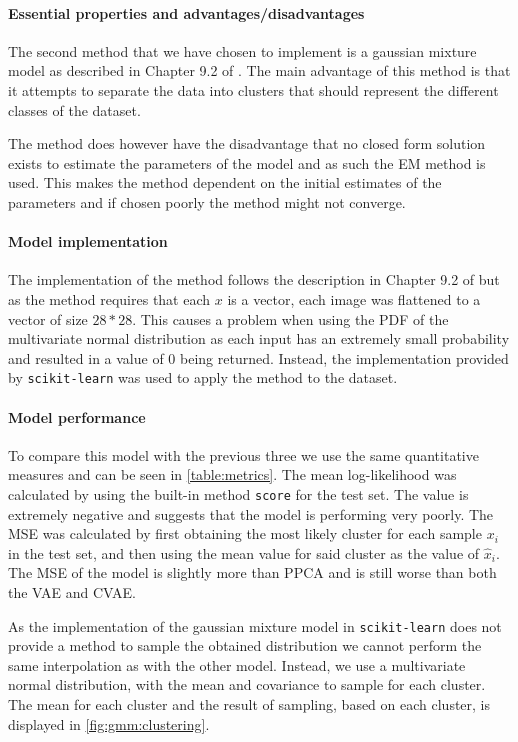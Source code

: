 \paragraph{Essential properties and advantages/disadvantages} 
The second method that we have chosen to implement is a gaussian mixture model as described in Chapter 9.2 of \citep{bishop2006pattern}. The main advantage of this method is that it attempts to separate the data into clusters that should represent the different classes of the dataset.  

The method does however have the disadvantage that no closed form solution exists to estimate the parameters of the model and as such the EM method is used. This makes the method dependent on the initial estimates of the parameters and if chosen poorly the method might not converge.  

\paragraph{Model implementation} 
The implementation of the method follows the description in Chapter 9.2 of \citep{bishop2006pattern} but as the method requires that each $x$ is a vector, each image was flattened to a vector of size $28 * 28$. This causes a problem when using the PDF of the multivariate normal distribution as each input has an extremely small probability and resulted in a value of $0$ being returned. Instead, the implementation provided by \texttt{scikit-learn} was used to apply the method to the dataset.  

\paragraph{Model performance} 
To compare this model with the previous three we use the same quantitative measures and can be seen in \cref{table:metrics}. The mean log-likelihood was calculated by using the built-in method \texttt{score} for the test set. The value is extremely negative and suggests that the model is performing very poorly. The MSE was calculated by first obtaining the most likely cluster for each sample $x_i$ in the test set, and then using the mean value for said cluster as the value of $\hat{x}_i$. The MSE of the model is slightly more than PPCA and is still worse than both the VAE and CVAE.  

As the implementation of the gaussian mixture model in \texttt{scikit-learn} does not provide a method to sample the obtained distribution we cannot perform the same interpolation as with the other model. Instead, we use a multivariate normal distribution, with the mean and covariance to sample for each cluster. The mean for each cluster and the result of sampling, based on each cluster, is displayed in \cref{fig:gmm:clustering}.  

